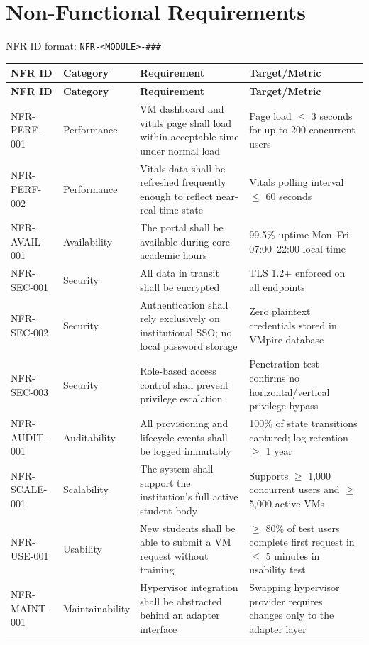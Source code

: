 \documentclass[12pt,letterpaper]{article}
\newcommand{\code}[1]{\texttt{\color{codegray}#1}}
\begin{document}
\section{Non-Functional Requirements}

NFR ID format: \code{NFR-<MODULE>-\#\#\#}

\begin{longtable}{L{2.8cm} L{2.5cm} L{5cm} L{3.5cm}}
  \toprule
  \textbf{NFR ID} & \textbf{Category} & \textbf{Requirement} & \textbf{Target/Metric} \\
  \midrule
  \endfirsthead
  \toprule
  \textbf{NFR ID} & \textbf{Category} & \textbf{Requirement} & \textbf{Target/Metric} \\
  \midrule
  \endhead
  \bottomrule
  \endfoot

  NFR-PERF-001 & Performance     & VM dashboard and vitals page shall load within acceptable time under normal load & Page load $\leq$ 3 seconds for up to 200 concurrent users \\
  \addlinespace
  NFR-PERF-002 & Performance     & Vitals data shall be refreshed frequently enough to reflect near-real-time state & Vitals polling interval $\leq$ 60 seconds \\
  \addlinespace
  NFR-AVAIL-001 & Availability    & The portal shall be available during core academic hours & 99.5\% uptime Mon--Fri 07:00--22:00 local time \\
  \addlinespace
  NFR-SEC-001 & Security        & All data in transit shall be encrypted & TLS 1.2+ enforced on all endpoints \\
  \addlinespace
  NFR-SEC-002 & Security        & Authentication shall rely exclusively on institutional SSO; no local password storage & Zero plaintext credentials stored in VMpire database \\
  \addlinespace
  NFR-SEC-003 & Security        & Role-based access control shall prevent privilege escalation & Penetration test confirms no horizontal/vertical privilege bypass \\
  \addlinespace
  NFR-AUDIT-001 & Auditability    & All provisioning and lifecycle events shall be logged immutably & 100\% of state transitions captured; log retention $\geq$ 1 year \\
  \addlinespace
  NFR-SCALE-001 & Scalability     & The system shall support the institution's full active student body & Supports $\geq$ 1,000 concurrent users and $\geq$ 5,000 active VMs \\
  \addlinespace
  NFR-USE-001 & Usability       & New students shall be able to submit a VM request without training & $\geq$ 80\% of test users complete first request in $\leq$ 5 minutes in usability test \\
  \addlinespace
  NFR-MAINT-001 & Maintainability & Hypervisor integration shall be abstracted behind an adapter interface & Swapping hypervisor provider requires changes only to the adapter layer \\
\end{longtable}
\end{document}
